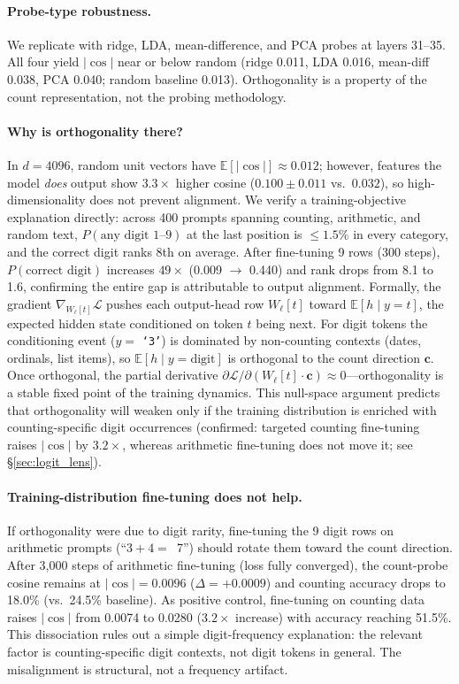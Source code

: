 \documentclass{article}
\begin{document}
\paragraph{Probe-type robustness.}
We replicate with ridge, LDA, mean-difference, and PCA probes at layers 31--35.
All four yield $|\cos|$ near or below random (ridge 0.011, LDA 0.016,
mean-diff 0.038, PCA 0.040; random baseline 0.013).
Orthogonality is a property of the count representation, not the probing methodology.

\paragraph{Why is orthogonality there?}
In $d{=}4096$, random unit vectors have $\mathbb{E}[|\cos|] \approx 0.012$;
however, features the model \emph{does} output show $3.3\times$ higher cosine
($0.100 \pm 0.011$ vs.\ $0.032$), so high-dimensionality does not prevent alignment.
We verify a training-objective explanation directly: across 400 prompts spanning
counting, arithmetic, and random text, $P(\text{any digit 1--9})$ at the last position
is $\leq 1.5\%$ in every category, and the correct digit ranks 8th on average.
After fine-tuning 9 rows (300 steps), $P(\text{correct digit})$ increases $49\times$
(0.009 $\to$ 0.440) and rank drops from 8.1 to 1.6, confirming the entire gap
is attributable to output alignment.
Formally, the gradient $\nabla_{W_{\ell}[t]} \mathcal{L}$ pushes each output-head
row $W_{\ell}[t]$ toward $\mathbb{E}[h \mid y{=}t]$, the expected hidden state
conditioned on token $t$ being next.
For digit tokens the conditioning event ($y {=}$ \texttt{`3'}) is dominated by
non-counting contexts (dates, ordinals, list items), so
$\mathbb{E}[h \mid y{=}\text{digit}]$ is orthogonal to the count direction $\mathbf{c}$.
Once orthogonal, the partial derivative
$\partial\mathcal{L}/\partial(W_{\ell}[t]\cdot\mathbf{c}) \approx 0$---orthogonality
is a stable fixed point of the training dynamics.
This null-space argument predicts that orthogonality will weaken only if the
training distribution is enriched with counting-specific digit occurrences
(confirmed: targeted counting fine-tuning raises $|\cos|$ by $3.2\times$,
whereas arithmetic fine-tuning does not move it; see \S\ref{sec:logit_lens}).

\paragraph{Training-distribution fine-tuning does not help.}
If orthogonality were due to digit rarity, fine-tuning the 9 digit rows on
arithmetic prompts (``$3+4=$~7'') should rotate them toward the count direction.
After 3{,}000 steps of arithmetic fine-tuning (loss fully converged),
the count-probe cosine remains at $|\cos| = 0.0096$ ($\Delta = {+}0.0009$)
and counting accuracy drops to 18.0\% (vs.\ 24.5\% baseline).
As positive control, fine-tuning on counting data raises $|\cos|$ from 0.0074 to
0.0280 ($3.2\times$ increase) with accuracy reaching 51.5\%.
This dissociation rules out a simple digit-frequency explanation: the relevant factor is counting-specific digit contexts, not digit tokens in general. The misalignment is structural, not a frequency artifact.
\end{document}

